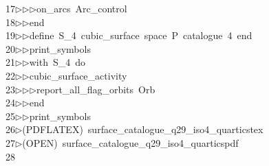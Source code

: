 \begin{tabbing}
17\>$\triangleright$\>$\triangleright$\>$\triangleright$\>on\_arcs\ Arc\_control\ \\[0pt]
18\>$\triangleright$\>$\triangleright$\>end\ \\[0pt]
19\>$\triangleright$\>$\triangleright$\>define\ S\_4\ cubic\_surface\ space\ P\ catalogue\ 4\ end\ \\[0pt]
20\>$\triangleright$\>$\triangleright$\>print\_symbols\ \\[0pt]
21\>$\triangleright$\>$\triangleright$\>with\ S\_4\ do\ \\[0pt]
22\>$\triangleright$\>$\triangleright$\>cubic\_surface\_activity\ \\[0pt]
23\>$\triangleright$\>$\triangleright$\>$\triangleright$\>report\_all\_flag\_orbits\ Orb\ \\[0pt]
24\>$\triangleright$\>$\triangleright$\>end\ \\[0pt]
25\>$\triangleright$\>$\triangleright$\>print\_symbols\\[0pt]
26\>$\triangleright$\>(PDFLATEX)\ surface\_catalogue\_q29\_iso4\_quarticstex\\[0pt]
27\>$\triangleright$\>(OPEN)\ surface\_catalogue\_q29\_iso4\_quarticspdf\\[0pt]
28\>\end{tabbing}
